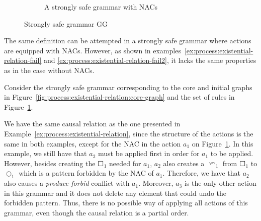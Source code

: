 \begin{example}
\begin{figure}[!ht]
\begin{subfigure}[t]{.5\textwidth}
    \caption{A strongly safe grammar with NACs}\label{fig:process:existential-relation:example-nacs}
  \end{subfigure}
  \caption{Strongly safe grammar GG}\label{fig:process:existential-relation}
\end{figure}
\end{example}

The same definition can be attempted in a strongly safe grammar where actions are equipped with NACs. However, as shown in examples~\ref{ex:process:existential-relation-fail} and \ref{ex:process:existential-relation-fail2}, it lacks the same properties as in the case without NACs.

\begin{example}\label{ex:process:existential-relation-fail}Consider the strongly safe grammar corresponding to the core and initial graphs in Figure~\ref{fig:process:existential-relation:core-graph} and the set of rules in Figure~\ref{fig:process:existential-relation:example-nacs}.

We have the same causal relation as the one presented in Example~\ref{ex:process:existential-relation}, since the structure of the actions is the same in both examples, except for the NAC in the action $a_1$ on Figure~\ref{fig:process:existential-relation:example-nacs}. In this example, we still have that $a_2$ must be applied first in order for $a_1$ to be applied. However, besides creating the $\Square_1$ needed for $a_1$, $a_2$ also creates a $\curvearrowleft_1$ from $\Square_1$ to
  $\Circle_1$ which is a pattern forbidden by the NAC of $a_1$. Therefore, we have that $a_2$ also causes a \emph{produce-forbid} conflict with $a_1$. Moreover, $a_3$ is the only other action in this grammar and it does not delete any element that could undo the forbidden pattern. Thus, there is no possible way of applying all actions of this grammar, even though the causal relation is a partial order.\end{example}

